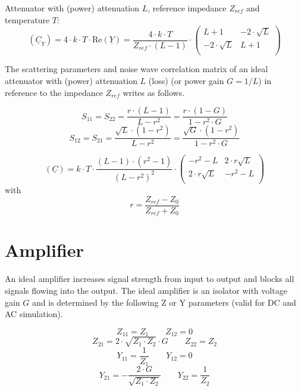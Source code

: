 Attenuator with (power) attenuation $L$, reference impedance $Z_{ref}$
and temperature $T$:
\begin{equation}
(\underline{C}_Y) = 4\cdot k\cdot T\cdot \textrm{Re}\left(\underline{Y}\right)
 = \frac{4\cdot k\cdot T}{Z_{ref}\cdot (L-1)} \cdot
\begin{pmatrix}
 L+1            & -2\cdot\sqrt{L} \\
-2\cdot\sqrt{L} &  L+1 \\
\end{pmatrix}
\end{equation}

The scattering parameters and noise wave correlation matrix of an
ideal attenuator with (power) attenuation $L$ (loss) (or power gain
$G=1/L$) in reference to the impedance $Z_{ref}$ writes as follows.

\begin{equation}
S_{11} = S_{22} = \frac{r\cdot(L-1)}{L-r^2} = \frac{r\cdot(1-G)}{1-r^2\cdot G}
\end{equation}
\begin{equation}
S_{12} = S_{21} = \frac{\sqrt{L}\cdot(1-r^2)}{L-r^2} = \frac{\sqrt{G}\cdot(1-r^2)}{1-r^2\cdot G}
\end{equation}

\begin{equation}
(\underline{C}) = k\cdot T\cdot\frac{(L-1)\cdot(r^2-1)}{(L-r^2)^2}\cdot
\begin{pmatrix}
  -r^2-L           & 2\cdot r\sqrt{L}\\
  2\cdot r\sqrt{L} & -r^2-L\\
\end{pmatrix}
\end{equation}
with
\begin{equation}
r=\frac{Z_{ref}-Z_0}{Z_{ref}+Z_0}
\end{equation}


\section{Amplifier}

An ideal amplifier increases signal strength from input to output and
blocks all signals flowing into the output.  
The ideal amplifier is an isolator with voltage gain $G$ and is
determined by the following Z or Y parameters (valid for DC and
AC simulation).

\begin{equation}
Z_{11} = Z_1  \qquad
Z_{12} = 0
\end{equation}
\begin{equation}
Z_{21} = 2\cdot\sqrt{Z_1\cdot Z_2}\cdot G  \qquad
Z_{22} = Z_2
\end{equation}
\begin{equation}
Y_{11} = \frac{1}{Z_1}  \qquad
Y_{12} = 0
\end{equation}
\begin{equation}
Y_{21} = -\frac{2\cdot G}{\sqrt{Z_1\cdot Z_2}}  \qquad
Y_{22} = \frac{1}{Z_2}
\end{equation}

